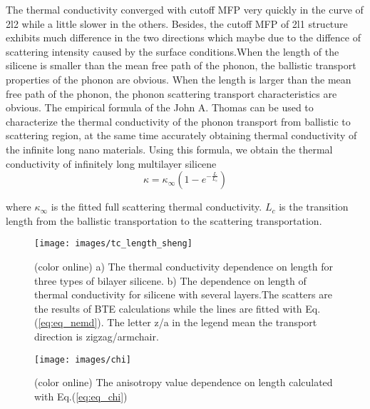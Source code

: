 \documentclass[%
 reprint,
 amsmath,amssymb,
 aps,
 prb,
]{revtex4-1}
\begin{document}
The thermal conductivity converged with cutoff MFP very quickly in the curve of 2l2 while a little slower in the others. Besides, the cutoff MFP of 2l1 structure exhibits much difference in the two directions  which maybe due to the diffence of scattering intensity caused by the surface conditions.When the length of the silicene is smaller than the mean free path of the phonon, the ballistic transport properties of the phonon are obvious. When the length is larger than the mean free path of the phonon, the phonon scattering transport characteristics are obvious. The empirical formula of the John A. Thomas\cite{Thomas2010} can be used to characterize the thermal conductivity of the phonon transport from ballistic to scattering region, at the same time accurately obtaining thermal conductivity of the infinite long nano materials. Using this formula, we obtain the thermal conductivity of infinitely long multilayer silicene
\begin{equation}
  \kappa = \kappa_\infty (1-e^{-\frac{L}{L_c}}) \label{eq:eq_nemd}
\end{equation}

where $\kappa_\infty$ is the fitted full scattering thermal conductivity. $L_c$ is the transition length from the ballistic transportation to the scattering transportation.

\begin{figure}[b]
  \texttt{[image: images/tc\_length\_sheng]}
  \caption{\label{fig:tc_length_sheng} (color online) a) The thermal conductivity dependence on length for three types of bilayer silicene. b) The dependence on length of thermal conductivity for silicene with several layers.The scatters are the results of BTE calculations while the lines are fitted with Eq.(\ref{eq:eq_nemd}). The letter z/a in the legend mean the transport direction is zigzag/armchair.}
\end{figure}

\begin{figure}[b]
  \texttt{[image: images/chi]}{}
  \caption{\label{fig:chi} (color online) The anisotropy value dependence on length calculated with Eq.(\ref{eq:eq_chi})}
\end{figure}
\end{document}
